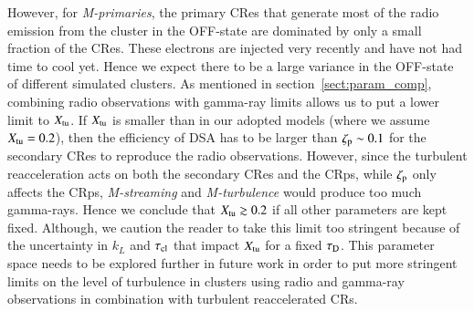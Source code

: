 \documentclass[fleqn,usenatbib,useAMS]{mnras}
\newcommand{\Mstream}{{\it M-streaming}\xspace}
\newcommand{\Mflatturb}{{\it M-turbulence}\xspace}
\newcommand{\Mprimary}{{\it M-primaries}\xspace}
\begin{document}
However, for \Mprimary, the primary CRes that generate most of the
radio emission from the cluster in the OFF-state are dominated by only
a small fraction of the CRes. These electrons are injected very
recently and have not had time to cool yet. Hence we expect there to
be a large variance in the OFF-state of different simulated
clusters. As mentioned in section~\ref{sect:param_comp}, combining
radio observations with gamma-ray limits allows us to put a lower
limit to $X_{\mathrm{tu}}$.  If $X_{\mathrm{tu}}$ is smaller than in our adopted
models (where we assume $X_{\mathrm{tu}}=0.2$), then the efficiency of DSA
has to be larger than $\zeta_{\mathrm{p}}\sim 0.1$ for the secondary CRes
to reproduce the radio observations. However, since the turbulent
reacceleration acts on both the secondary CRes and the CRps, while
$\zeta_{\mathrm{p}}$ only affects the CRps, \Mstream and \Mflatturb would
produce too much gamma-rays. Hence we conclude that
$X_{\mathrm{tu}}\gtrsim0.2$ if all other parameters are kept
fixed. Although, we caution the reader to take this limit too
stringent because of the uncertainty in $k_L$ and $\tau_{\mathrm{cl}}$ that
impact $X_{\mathrm{tu}}$ for a fixed $\tau_{\mathrm{D}}$. This parameter space
needs to be explored further in future work in order to put more
stringent limits on the level of turbulence in clusters using radio
and gamma-ray observations in combination with turbulent reaccelerated
CRs.
\end{document}

